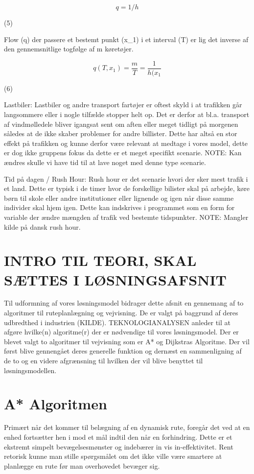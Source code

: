\[ q = 1/h \]\label{eq:Equation5}\begin{flushright}(5)\end{flushright}

Flow (q) der passere et bestemt punkt (x\_1) i et interval (T) er lig det inverse af den gennemsnitlige togfølge af m køretøjer.

\[ q(T, x_1) = \frac{m}{T} = \frac{1}{h(x_1} \]\label{eq:Equation6}\begin{flushright}(6)\end{flushright}

Lastbiler:
Lastbiler og andre transport fartøjer er oftest skyld i at trafikken går langsommere eller i nogle tilfælde stopper helt op. Det er derfor at bl.a. transport af vindmølledele bliver igangsat sent om aften eller meget tidligt på morgenen således at de ikke skaber problemer for andre billister. Dette har altså en stor effekt på trafikken og kunne derfor være relevant at medtage i vores model, dette er dog ikke gruppens fokus da dette er et meget specifikt scenarie.
NOTE: Kan ændres skulle vi have tid til at lave noget med denne type scenarie.

Tid på dagen / Rush Hour: 
Rush hour er det scenarie hvori der sker mest trafik i et land. Dette er typisk i de timer hvor de forskellige bilister skal på arbejde, køre børn til skole eller andre institutioner eller lignende og igen når disse samme individer skal hjem igen. Dette kan indskrives i programmet som en form for variable der ændre mængden af trafik ved bestemte tidspunkter.
NOTE: Mangler kilde på dansk rush hour.

\section{INTRO TIL TEORI, SKAL SÆTTES I LØSNINGSAFSNIT}
Til udformning af vores løsningsmodel bidrager dette afsnit en gennemang af to algoritmer til ruteplanlægning og vejvisning. De er valgt på baggrund af deres udbredthed i industrien (KILDE). TEKNOLOGIANALYSEN anleder til at afgøre hvilke(n) algoritme(r) der er nødvendige til vores løsningsmodel. Der er blevet valgt to algoritmer til vejvisning som er A* og Dijkstras Algoritme.
Der vil først blive gennengået deres generelle funktion og dernæst en sammenligning af de to og en videre afgrænsning til hvilken der vil blive benyttet til løsningsmodellen.

\vspace{5mm}

\section{A* Algoritmen}
Primært når det kommer til belægning af en dynamisk rute, foregår det ved at en enhed fortsætter hen i mod et mål indtil den når en forhindring. Dette er et ekstremt simpelt bevægelsesmønster og indebærer in vis in-effektivitet. Rent retorisk kunne man stille spørgsmålet om det ikke ville være smartere at planlægge en rute før man overhovedet bevæger sig.

